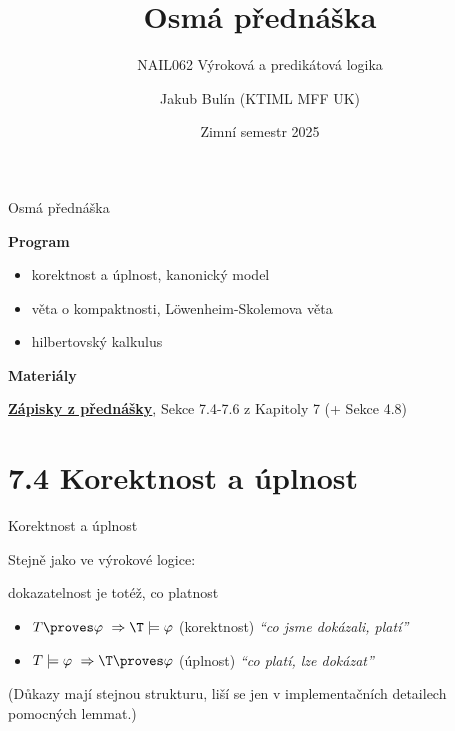 \documentclass{beamer}
\title{Osmá přednáška}
\subtitle{NAIL062 Výroková a predikátová logika}
\author{Jakub Bulín (KTIML MFF UK)}
\date{Zimní semestr 2025}
\begin{document}
\maketitle


\begin{frame}{Osmá přednáška}

    \textbf{Program}
        \begin{itemize}
            \item korektnost a úplnost, kanonický model
            \item věta o kompaktnosti, Löwenheim-Skolemova věta
            \item hilbertovský kalkulus
        \end{itemize}

    \textbf{Materiály}

        \href{https://github.com/jbulin-mff-uk/nail062/raw/main/lecture/lecture-notes/lecture-notes.pdf}{\alert{\textbf{Zápisky z přednášky}}}, Sekce 7.4-7.6 z Kapitoly 7 (+ Sekce 4.8)

\end{frame}


\section{7.4 Korektnost a úplnost}


\begin{frame}{Korektnost a úplnost}
    
    \pause
    Stejně jako ve výrokové logice:
    
    \pause
    \begin{center}
        \alert{dokazatelnost} je totéž, co \alert{platnost}    
    \end{center}    

    \pause
    \begin{itemize}
        \item \alert{$T\proves\varphi\ \Rightarrow\T\models\varphi$} \hspace{0.5cm} (korektnost) \hfill {\it``co jsme dokázali, platí''}
        \item\alert{$T\models\varphi\ \Rightarrow\T\proves\varphi$}  \hspace{0.5cm} (úplnost) \hfill {\it ``co platí, lze dokázat''}
    \end{itemize} 

    \bigskip

    \pause
    (Důkazy mají stejnou strukturu, liší se jen v implementačních detailech pomocných lemmat.)
 
\end{frame}
\end{document}
